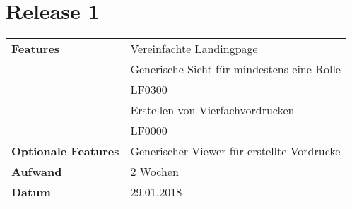 \section*{Release 1 }
\label{sec:release_1}


\begin{tabular}{p{5cm}p{9cm}}
    \textbf{Features} & Vereinfachte Landingpage \\
    & Generische Sicht für mindestens eine Rolle \\
    & \hspace{8pt} LF0300 \\
    & Erstellen von Vierfachvordrucken \\
    & \hspace{8pt} LF0000 \\
    \textbf{Optionale Features} & Generischer Viewer für erstellte Vordrucke \\
    \hline
    \textbf{Aufwand} & 2 Wochen \\
    \hline
    \textbf{Datum} & 29.01.2018
\end{tabular}